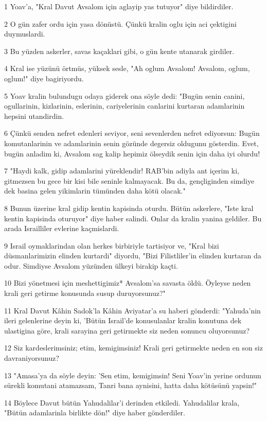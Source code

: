 \par 1 Yoav'a, "Kral Davut Avsalom için aglayip yas tutuyor" diye bildirdiler.
\par 2 O gün zafer ordu için yasa dönüstü. Çünkü kralin oglu için aci çektigini duymuslardi.
\par 3 Bu yüzden askerler, savas kaçaklari gibi, o gün kente utanarak girdiler.
\par 4 Kral ise yüzünü örtmüs, yüksek sesle, "Ah oglum Avsalom! Avsalom, oglum, oglum!" diye bagiriyordu.
\par 5 Yoav kralin bulundugu odaya giderek ona söyle dedi: "Bugün senin canini, ogullarinin, kizlarinin, eslerinin, cariyelerinin canlarini kurtaran adamlarinin hepsini utandirdin.
\par 6 Çünkü senden nefret edenleri seviyor, seni sevenlerden nefret ediyorsun: Bugün komutanlarinin ve adamlarinin senin gözünde degersiz oldugunu gösterdin. Evet, bugün anladim ki, Avsalom sag kalip hepimiz ölseydik senin için daha iyi olurdu!
\par 7 "Haydi kalk, gidip adamlarini yüreklendir! RAB'bin adiyla ant içerim ki, gitmezsen bu gece bir kisi bile seninle kalmayacak. Bu da, gençliginden simdiye dek basina gelen yikimlarin tümünden daha kötü olacak."
\par 8 Bunun üzerine kral gidip kentin kapisinda oturdu. Bütün askerlere, "Iste kral kentin kapisinda oturuyor" diye haber salindi. Onlar da kralin yanina geldiler. Bu arada Israilliler evlerine kaçmislardi.
\par 9 Israil oymaklarindan olan herkes birbiriyle tartisiyor ve, "Kral bizi düsmanlarimizin elinden kurtardi" diyordu, "Bizi Filistliler'in elinden kurtaran da odur. Simdiyse Avsalom yüzünden ülkeyi birakip kaçti.
\par 10 Bizi yönetmesi için meshettigimiz* Avsalom'sa savasta öldü. Öyleyse neden krali geri getirme konusunda susup duruyorsunuz?"
\par 11 Kral Davut Kâhin Sadok'la Kâhin Aviyatar'a su haberi gönderdi: "Yahuda'nin ileri gelenlerine deyin ki, 'Bütün Israil'de konusulanlar kralin konutuna dek ulastigina göre, krali sarayina geri getirmekte siz neden sonuncu oluyorsunuz?
\par 12 Siz kardeslerimsiniz; etim, kemigimsiniz! Krali geri getirmekte neden en son siz davraniyorsunuz?
\par 13 "Amasa'ya da söyle deyin: 'Sen etim, kemigimsin! Seni Yoav'in yerine ordunun sürekli komutani atamazsam, Tanri bana aynisini, hatta daha kötüsünü yapsin!"
\par 14 Böylece Davut bütün Yahudalilar'i derinden etkiledi. Yahudalilar krala, "Bütün adamlarinla birlikte dön!" diye haber gönderdiler.
